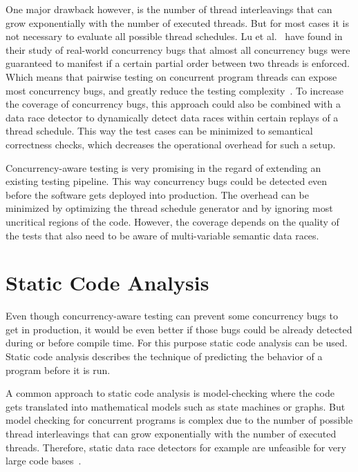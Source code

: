 \documentclass[english]{lni}
\begin{document}
One major drawback however, is the number of thread interleavings that can grow exponentially with the number of executed threads.
But for most cases it is not necessary to evaluate all possible thread schedules.
Lu et al.~\cite{lu2008mistakes} have found in their study of real-world concurrency bugs that almost all concurrency bugs were guaranteed to manifest if a certain partial order between two threads is enforced.
Which means that pairwise testing on concurrent program threads can expose most concurrency bugs, and greatly reduce the testing complexity~\cite{lu2008mistakes}.
To increase the coverage of concurrency bugs, this approach could also be combined with a data race detector to dynamically detect data races within certain replays of a thread schedule.
This way the test cases can be minimized to semantical correctness checks, which decreases the operational overhead for such a setup.

Concurrency-aware testing is very promising in the regard of extending an existing testing pipeline.
This way concurrency bugs could be detected even before the software gets deployed into production.
The overhead can be minimized by optimizing the thread schedule generator and by ignoring most uncritical regions of the code.
However, the coverage depends on the quality of the tests that also need to be aware of multi-variable semantic data races.


\section{Static Code Analysis}
\label{sct:static}

Even though concurrency-aware testing can prevent some concurrency bugs to get in production, it would be even better if those bugs could be already detected during or before compile time.
For this purpose static code analysis can be used.
Static code analysis describes the technique of predicting the behavior of a program before it is run.

A common approach to static code analysis is model-checking where the code gets translated into mathematical models such as state machines or graphs.
But model checking for concurrent programs is complex due to the number of possible thread interleavings that can grow exponentially with the number of executed threads.
Therefore, static data race detectors for example are unfeasible for very large code bases~\cite{serebry2009threadsanitizer}.
\end{document}
